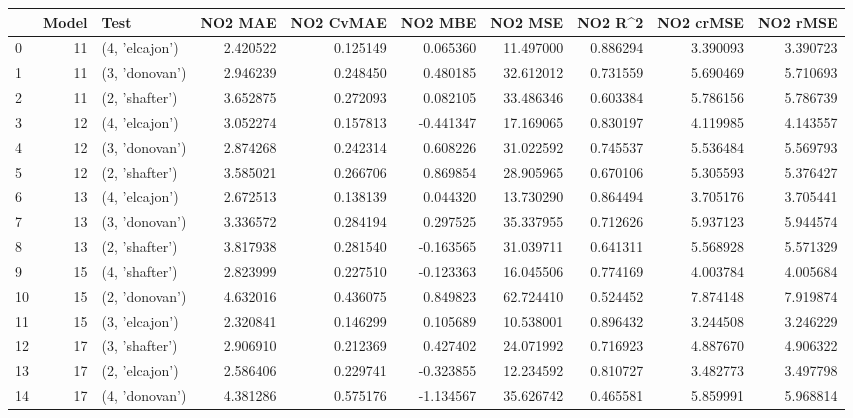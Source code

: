 \begin{tabular}{lrlrrrrrrr}
\toprule
{} &  Model &            Test &   NO2 MAE &  NO2 CvMAE &   NO2 MBE &    NO2 MSE &   NO2 R\textasciicircum2 &  NO2 crMSE &  NO2 rMSE \\
\midrule
0  &     11 &  (4, 'elcajon') &  2.420522 &   0.125149 &  0.065360 &  11.497000 &  0.886294 &   3.390093 &  3.390723 \\
1  &     11 &  (3, 'donovan') &  2.946239 &   0.248450 &  0.480185 &  32.612012 &  0.731559 &   5.690469 &  5.710693 \\
2  &     11 &  (2, 'shafter') &  3.652875 &   0.272093 &  0.082105 &  33.486346 &  0.603384 &   5.786156 &  5.786739 \\
3  &     12 &  (4, 'elcajon') &  3.052274 &   0.157813 & -0.441347 &  17.169065 &  0.830197 &   4.119985 &  4.143557 \\
4  &     12 &  (3, 'donovan') &  2.874268 &   0.242314 &  0.608226 &  31.022592 &  0.745537 &   5.536484 &  5.569793 \\
5  &     12 &  (2, 'shafter') &  3.585021 &   0.266706 &  0.869854 &  28.905965 &  0.670106 &   5.305593 &  5.376427 \\
6  &     13 &  (4, 'elcajon') &  2.672513 &   0.138139 &  0.044320 &  13.730290 &  0.864494 &   3.705176 &  3.705441 \\
7  &     13 &  (3, 'donovan') &  3.336572 &   0.284194 &  0.297525 &  35.337955 &  0.712626 &   5.937123 &  5.944574 \\
8  &     13 &  (2, 'shafter') &  3.817938 &   0.281540 & -0.163565 &  31.039711 &  0.641311 &   5.568928 &  5.571329 \\
9  &     15 &  (4, 'shafter') &  2.823999 &   0.227510 & -0.123363 &  16.045506 &  0.774169 &   4.003784 &  4.005684 \\
10 &     15 &  (2, 'donovan') &  4.632016 &   0.436075 &  0.849823 &  62.724410 &  0.524452 &   7.874148 &  7.919874 \\
11 &     15 &  (3, 'elcajon') &  2.320841 &   0.146299 &  0.105689 &  10.538001 &  0.896432 &   3.244508 &  3.246229 \\
12 &     17 &  (3, 'shafter') &  2.906910 &   0.212369 &  0.427402 &  24.071992 &  0.716923 &   4.887670 &  4.906322 \\
13 &     17 &  (2, 'elcajon') &  2.586406 &   0.229741 & -0.323855 &  12.234592 &  0.810727 &   3.482773 &  3.497798 \\
14 &     17 &  (4, 'donovan') &  4.381286 &   0.575176 & -1.134567 &  35.626742 &  0.465581 &   5.859991 &  5.968814 \\

\end{tabular}
